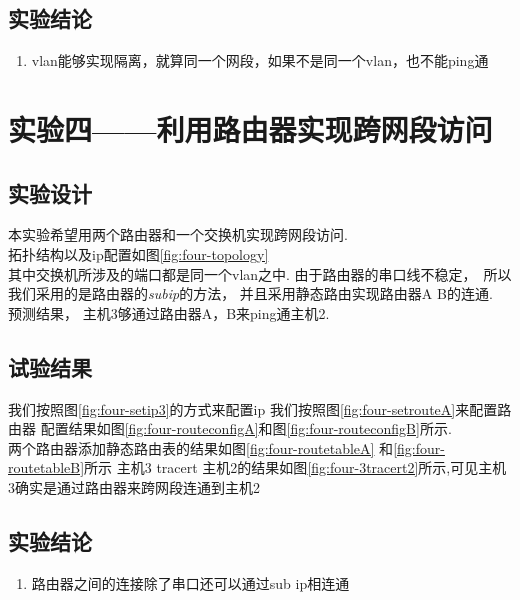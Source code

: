	\subsection{实验结论}
		\begin{enumerate}
		  \item vlan能够实现隔离，就算同一个网段，如果不是同一个vlan，也不能ping通
		\end{enumerate}
\section{实验四——利用路由器实现跨网段访问}
	\subsection{实验设计}
		本实验希望用两个路由器和一个交换机实现跨网段访问.\\
		拓扑结构以及ip配置如图\ref{fig:four-topology}\\
		其中交换机所涉及的端口都是同一个vlan之中.
		由于路由器的串口线不稳定，　所以我们采用的是路由器的\emph{subip}的方法， 并且采用静态路由实现路由器A B的连通.\\
		预测结果， 主机3够通过路由器A，B来ping通主机2.
	\subsection{试验结果}
	    我们按照图\ref{fig:four-setip3}的方式来配置ip
		我们按照图\ref{fig:four-setrouteA}来配置路由器
		配置结果如图\ref{fig:four-routeconfigA}和图\ref{fig:four-routeconfigB}所示.\\
		两个路由器添加静态路由表的结果如图\ref{fig:four-routetableA} 和\ref{fig:four-routetableB}所示
		主机3 tracert 主机2的结果如图\ref{fig:four-3tracert2}所示,可见主机3确实是通过路由器来跨网段连通到主机2
	\subsection{实验结论}
		\begin{enumerate}
		  \item 路由器之间的连接除了串口还可以通过sub ip相连通
		\end{enumerate}
